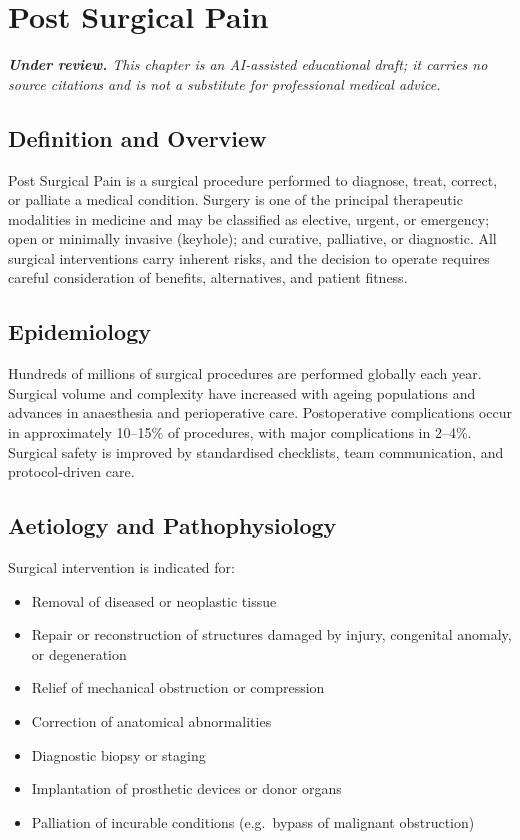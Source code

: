 \chapter{Post Surgical Pain}

\medskip
\noindent\textit{\textbf{Under review.} This chapter is an AI-assisted educational draft; it carries no source citations and is not a substitute for professional medical advice.}

\section*{Definition and Overview}
Post Surgical Pain is a surgical procedure performed to diagnose, treat, correct, or palliate a medical condition. Surgery is one of the principal therapeutic modalities in medicine and may be classified as elective, urgent, or emergency; open or minimally invasive (keyhole); and curative, palliative, or diagnostic. All surgical interventions carry inherent risks, and the decision to operate requires careful consideration of benefits, alternatives, and patient fitness.

\section*{Epidemiology}
Hundreds of millions of surgical procedures are performed globally each year. Surgical volume and complexity have increased with ageing populations and advances in anaesthesia and perioperative care. Postoperative complications occur in approximately 10--15\% of procedures, with major complications in 2--4\%. Surgical safety is improved by standardised checklists, team communication, and protocol-driven care.

\section*{Aetiology and Pathophysiology}
Surgical intervention is indicated for:

\begin{itemize}
    \item Removal of diseased or neoplastic tissue
    \item Repair or reconstruction of structures damaged by injury, congenital anomaly, or degeneration
    \item Relief of mechanical obstruction or compression
    \item Correction of anatomical abnormalities
    \item Diagnostic biopsy or staging
    \item Implantation of prosthetic devices or donor organs
    \item Palliation of incurable conditions (e.g.\ bypass of malignant obstruction)
\end{itemize}

